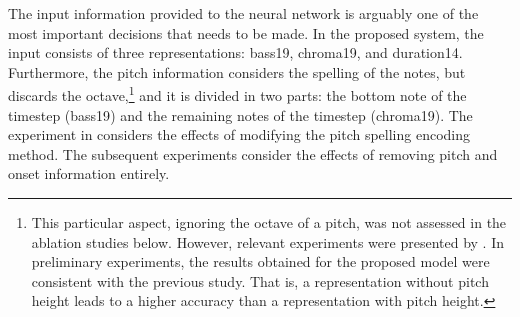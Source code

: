 
The input information provided to the neural network is
arguably one of the most important decisions that needs to
be made. In the proposed system, the input consists of three
representations: \gls{bass19}, \gls{chroma19}, and
\gls{duration14}. Furthermore, the pitch information
considers the spelling of the notes, but discards the
octave,\footnote{This particular aspect, ignoring the octave
of a pitch, was not assessed in the ablation studies below.
However, relevant experiments were presented by
\textcite{micchi2020not}. In preliminary experiments, the
results obtained for the proposed model were consistent with
the previous study. That is, a representation without pitch
height leads to a higher accuracy than a representation with
pitch height.} and it is divided in two parts: the bottom note of
the timestep (\gls{bass19}) and the remaining notes of the
timestep (\gls{chroma19}). The experiment in
 considers
the effects of modifying the pitch spelling encoding method.
The subsequent experiments consider the effects of removing
pitch and onset information entirely.

